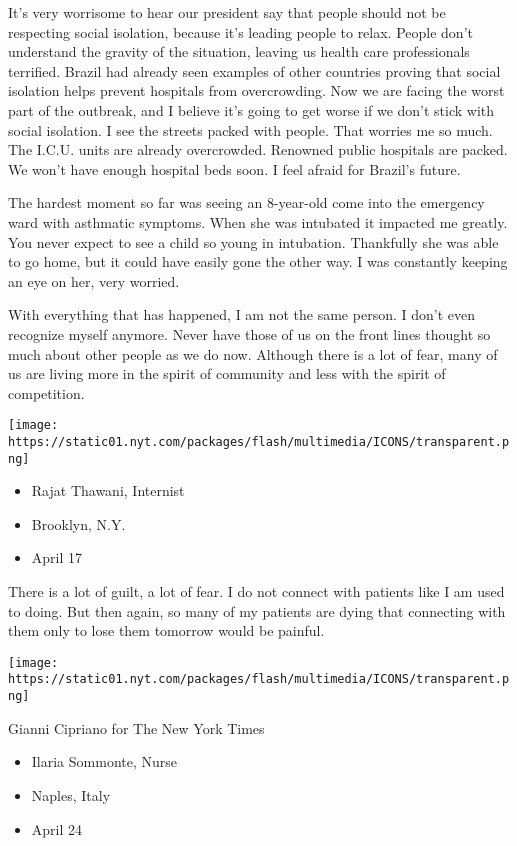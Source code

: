 It's very worrisome to hear our president say that people should not be
respecting social isolation, because it's leading people to relax.
People don't understand the gravity of the situation, leaving us health
care professionals terrified. Brazil had already seen examples of other
countries proving that social isolation helps prevent hospitals from
overcrowding. Now we are facing the worst part of the outbreak, and I
believe it's going to get worse if we don't stick with social isolation.
I see the streets packed with people. That worries me so much. The
I.C.U. units are already overcrowded. Renowned public hospitals are
packed. We won't have enough hospital beds soon. I feel afraid for
Brazil's future.

The hardest moment so far was seeing an 8-year-old come into the
emergency ward with asthmatic symptoms. When she was intubated it
impacted me greatly. You never expect to see a child so young in
intubation. Thankfully she was able to go home, but it could have easily
gone the other way. I was constantly keeping an eye on her, very
worried.

With everything that has happened, I am not the same person. I don't
even recognize myself anymore. Never have those of us on the front lines
thought so much about other people as we do now. Although there is a lot
of fear, many of us are living more in the spirit of community and less
with the spirit of competition.

\texttt{[image: https://static01.nyt.com/packages/flash/multimedia/ICONS/transparent.png]}

\begin{itemize}
\tightlist
\item
  Rajat Thawani, Internist
\item
  Brooklyn, N.Y.
\item
  April 17
\end{itemize}

There is a lot of guilt, a lot of fear. I do not connect with patients
like I am used to doing. But then again, so many of my patients are
dying that connecting with them only to lose them tomorrow would be
painful.

\texttt{[image: https://static01.nyt.com/packages/flash/multimedia/ICONS/transparent.png]}

Gianni Cipriano for The New York Times

\begin{itemize}
\tightlist
\item
  Ilaria Sommonte, Nurse
\item
  Naples, Italy
\item
  April 24
\end{itemize}

